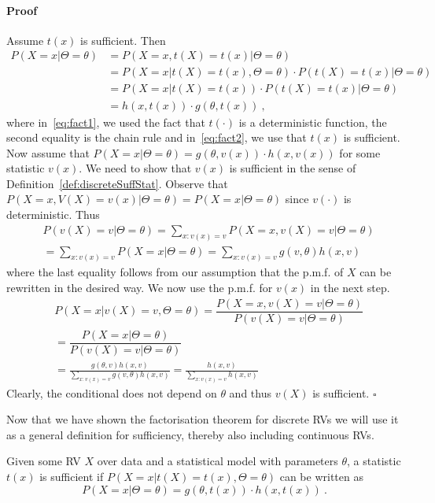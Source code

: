 \paragraph{Proof} Assume $ t(x) $ is sufficient. Then
\begin{align}
P(X = x | \Theta = \theta) &= P(X=x, t(X)=t(x) | \Theta = \theta) \label{eq:fact1}\\ 
&= P(X=x|t(X) = t(x), \Theta=\theta) \cdot P(t(X) = t(x)| \Theta = \theta)\\
&= P(X=x|t(X) = t(x)) \cdot P(t(X) = t(x)| \Theta = \theta) \label{eq:fact2}\\
&= h(x, t(x)) \cdot g(\theta, t(x)) \ , \nonumber
\end{align}
where in~\eqref{eq:fact1}, we used the fact that $t(\cdot)$ is a deterministic function, the second equality is the chain rule and in~\eqref{eq:fact2}, we use that $t(x)$ is sufficient.
Now assume that $ P(X = x | \Theta = \theta) = g(\theta, v(x)) \cdot h(x, v(x)) $ for some statistic $ v(x) $. We need to show
that $ v(x) $ is sufficient in the sense of Definition~\ref{def:discreteSuffStat}. Observe that $ P(X=x,V(X)=v(x)|\Theta = \theta) = P(X=x|\Theta = \theta) $
since $ v(\cdot) $ is deterministic. Thus
\begin{align}
&P(v(X)= v| \Theta = \theta) = \sum_{x:v(x)=v}P(X=x,v(X)=v| \Theta = \theta) \\
&= \sum_{x:v(x)=v}P(X=x | \Theta = \theta) = \sum_{x:v(x)=v} g(v, \theta) h(x,v) \nonumber
\end{align}
where the last equality follows from our assumption that the p.m.f. of $ X $ can be rewritten in the desired way. We now use the p.m.f. for $ v(x) $
in the next step.
\begin{align}
&P(X=x|v(X) = v, \Theta=\theta) = \dfrac{P(X=x,v(X)= v|\Theta = \theta)}{P(v(X) = v|\Theta = \theta)} \\
&= \dfrac{P(X=x|\Theta = \theta)}{P(v(X) = v|\Theta = \theta)}  \\
&= \frac{g(\theta, v)h(x, v)}{\sum_{x:v(x)=v} g(v, \theta) h(x,v)}
= \frac{h(x, v)}{\sum_{x:v(x)=v} h(x,v)}
\end{align}
Clearly, the conditional does not depend on $\theta $ and thus $ v(X) $ is sufficient. $ \square $ \bigskip


Now that we have shown the factorisation theorem for discrete RVs we will use it as a general definition for sufficiency, thereby
also including continuous RVs.
\begin{Definition}
Given some RV $ X $ over data and a statistical model with parameters $ \theta $, 
a statistic $ t(x) $ is sufficient if $ P(X=x|t(X) = t(x), \Theta = \theta) $ can be written as
$$ P(X = x | \Theta = \theta) = g(\theta, t(x)) \cdot h(x, t(x)) \ . $$
\end{Definition}

